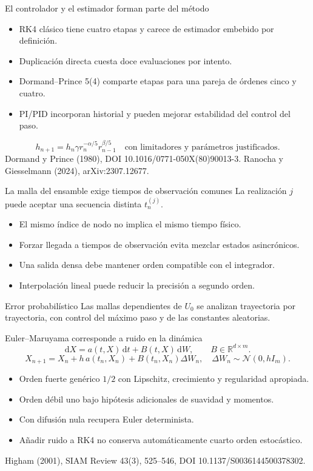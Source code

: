 \documentclass[aspectratio=169,11pt]{beamer}
\newcommand{\R}{\mathbb R}\newcommand{\E}{\mathbb E}
\newcommand{\source}[1]{\vfill{\tiny\color{graytext}#1}}
\begin{document}
\begin{frame}{El controlador y el estimador forman parte del método}
\begin{itemize}
\item RK4 clásico tiene cuatro etapas y carece de estimador embebido por definición.
\item Duplicación directa cuesta doce evaluaciones por intento.
\item Dormand--Prince 5(4) comparte etapas para una pareja de órdenes cinco y cuatro.
\item PI/PID incorporan historial y pueden mejorar estabilidad del control del paso.
\end{itemize}
\[
h_{n+1}=h_n\gamma r_n^{-\alpha/5}r_{n-1}^{\beta/5}
\quad\text{con limitadores y parámetros justificados.}
\]
\source{Dormand y Prince (1980), DOI 10.1016/0771-050X(80)90013-3.
Ranocha y Giesselmann (2024), arXiv:2307.12677.}
\end{frame}

\begin{frame}{La malla del ensamble exige tiempos de observación comunes}
La realización $j$ puede aceptar una secuencia distinta $t_n^{(j)}$.
\begin{itemize}
\item El mismo índice de nodo no implica el mismo tiempo físico.
\item Forzar llegada a tiempos de observación evita mezclar estados asincrónicos.
\item Una salida densa debe mantener orden compatible con el integrador.
\item Interpolación lineal puede reducir la precisión a segundo orden.
\end{itemize}
\begin{block}{Error probabilístico}
Las mallas dependientes de $U_0$ se analizan trayectoria por trayectoria,
con control del máximo paso y de las constantes aleatorias.
\end{block}
\end{frame}

\begin{frame}{Euler--Maruyama corresponde a ruido en la dinámica}
\[
\mathrm dX=a(t,X)\,\mathrm dt+B(t,X)\,\mathrm dW,
\qquad B\in\R^{d\times m}.
\]
\[
X_{n+1}=X_n+h\,a(t_n,X_n)+B(t_n,X_n)\Delta W_n,
\quad\Delta W_n\sim\mathcal N(0,hI_m).
\]
\begin{itemize}
\item Orden fuerte genérico $1/2$ con Lipschitz, crecimiento y regularidad apropiada.
\item Orden débil uno bajo hipótesis adicionales de suavidad y momentos.
\item Con difusión nula recupera Euler determinista.
\item Añadir ruido a RK4 no conserva automáticamente cuarto orden estocástico.
\end{itemize}
\source{Higham (2001), SIAM Review 43(3), 525--546, DOI 10.1137/S0036144500378302.}
\end{frame}
\end{document}
